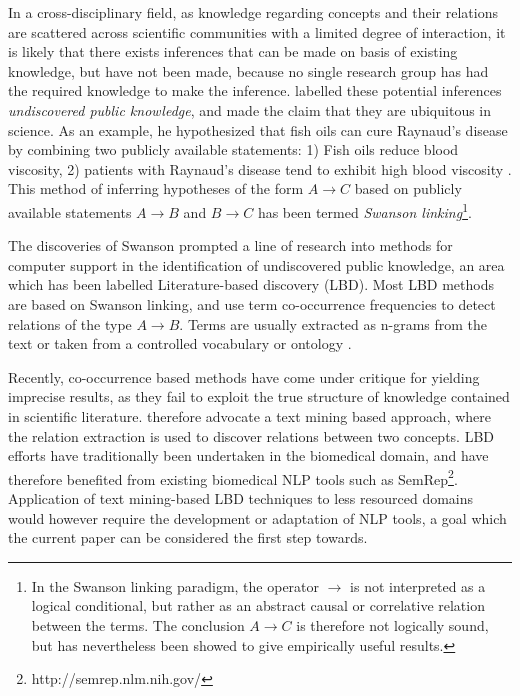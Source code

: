 \documentclass[10pt, a4paper]{article}
\begin{document}
In a cross-disciplinary field, as knowledge regarding concepts and their relations are scattered across scientific communities with a limited degree of interaction, it is likely that there exists inferences that can be made on basis of existing knowledge, but have not been made, because no single research group has had the required knowledge to make the inference. 
 labelled these potential inferences \emph{undiscovered public knowledge}, and made the claim that they are ubiquitous in science. 
As an example, he hypothesized that fish oils can cure Raynaud's disease by combining two publicly available statements: 1) Fish oils reduce blood viscosity, 2) patients with Raynaud's disease tend to exhibit high blood viscosity \cite{Swanson1986Fishoil}. 
This method of inferring hypotheses of the form $A \to C$ based on publicly available statements $A \to B$ and $B \to C$ has been termed \emph{Swanson linking}\footnote{In the Swanson linking paradigm, the operator $\to$ is not interpreted as a logical conditional, but rather as an abstract causal or correlative relation between the terms. The conclusion $A \to C$ is therefore not logically sound, but has nevertheless been showed to give empirically useful results.}. 

The discoveries of Swanson prompted a line of research into methods for computer support in the identification of undiscovered public knowledge, an area which has been labelled Literature-based discovery (LBD). 
Most LBD methods are based on Swanson linking, and use term co-occurrence frequencies to detect relations of the type $A \to B$. 
Terms are usually extracted as n-grams from the text \cite{Lindsay1999LBDLexicalStat} or taken from a controlled vocabulary or ontology \cite{Weeber2001ConceptsInLBD}.

Recently, co-occurrence based methods have come under critique for yielding imprecise results, as they fail to exploit the true structure of knowledge contained in scientific literature.
 therefore advocate a text mining based approach, where the relation extraction is used to discover relations between two concepts.
LBD efforts have traditionally been undertaken in the biomedical domain, and have therefore benefited from existing biomedical NLP tools such as SemRep\footnote{http://semrep.nlm.nih.gov/}.
Application of text mining-based LBD techniques to less resourced domains would however require the development or adaptation of NLP tools, a goal which the current paper can be considered the first step towards. 
\end{document}
